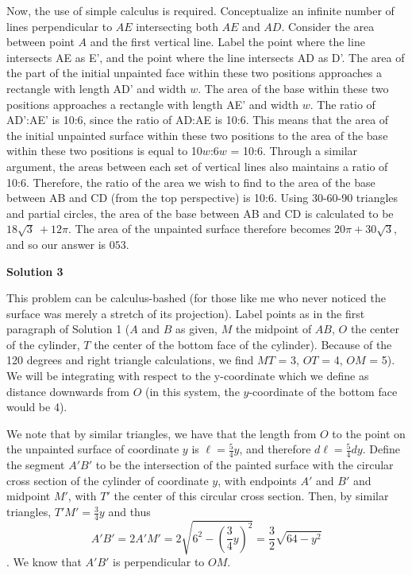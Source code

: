 \begin{enumerate}
 
Now, the use of simple calculus is required. Conceptualize an infinite number of lines perpendicular to $AE$ intersecting both $AE$ and $AD$. Consider the area between point $A$ and the first vertical line. Label the point where the line intersects AE as E', and the point where the line intersects AD as D'. The area of the part of the initial unpainted face within these two positions approaches a rectangle with length AD' and width $w$. The area of the base within these two positions approaches a rectangle with length AE' and width $w$. The ratio of AD':AE' is 10:6, since the ratio of AD:AE is 10:6. This means that the area of the initial unpainted surface within these two positions to the area of the base within these two positions is equal to 10$w$:6$w$ = 10:6. Through a similar argument, the areas between each set of vertical lines also maintains a ratio of 10:6. Therefore, the ratio of the area we wish to find to the area of the base between AB and CD (from the top perspective) is 10:6. Using 30-60-90 triangles and partial circles, the area of the base between AB and CD is calculated to be $18\sqrt{3}\ + 12 \pi$. The area of the unpainted surface therefore becomes $20\pi + 30\sqrt{3}$, and so our answer is $\boxed{053}$.

 



\textbf{Solution 3}

This problem can be calculus-bashed (for those like me who never noticed the surface was merely a stretch of its projection). Label points as in the first paragraph of Solution 1 ($A$ and $B$ as given, $M$ the midpoint of $AB$, $O$ the center of the cylinder, $T$ the center of the bottom face of the cylinder). Because of the 120 degrees and right triangle calculations, we find $MT$ = 3, $OT$ = 4, $OM$ = 5). We will be integrating with respect to the y-coordinate which we define as distance downwards from $O$ (in this system, the $y$-coordinate of the bottom face would be 4). 

 We note that by similar triangles, we have that the length from $O$ to the point on the unpainted surface of coordinate $y$ is $\ell = \frac{5}{4} y$, and therefore $d\ell = \frac{5}{4} dy$. Define the segment $A'B'$ to be the intersection of the painted surface with the circular cross section of the cylinder of coordinate $y$, with endpoints $A'$ and $B'$ and midpoint $M'$, with $T'$ the center of this circular cross section. Then, by similar triangles, $T'M' = \frac{3}{4} y$ and thus 
 \[A'B' = 2A' M' = 2 \sqrt{ 6^2 - \left( \frac{3}{4}y\right)^2 } = \frac{3}{2} \sqrt{ 64 - y^2 }\]. We know that $A'B'$ is perpendicular to $OM$. 


\end{enumerate}
